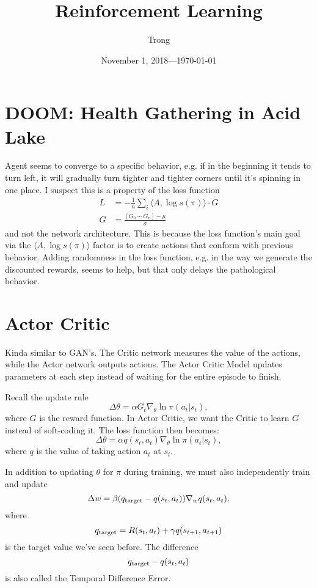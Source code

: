 \documentclass[20pt]{extarticle}
\title{Reinforcement Learning}
\author{Trong}
\date{November 1, 2018---\today}
\theoremstyle{plain}
\theoremstyle{definition}
\theoremstyle{remark}
\newcommand{\0}{\varnothing}
\renewcommand{\a}{\alpha}
\renewcommand{\b}{\beta}
\newcommand{\g}{\gamma}
\newcommand{\m}{\mu}
\newcommand{\s}{\sigma}
\renewcommand{\th}{\theta}
\newcommand{\D}{\Delta}
\newcommand{\<}{\langle}
\renewcommand{\>}{\rangle}
\begin{document}
\sloppy
\maketitle
\thispagestyle{empty}
\pagestyle{empty}
\tableofcontents

\section{DOOM: Health Gathering in Acid Lake}

Agent seems to converge to a specific behavior, e.g. if in the beginning it tends to turn left, it will gradually turn tighter and tighter corners until it's spinning in one place. I suspect this is a property of the loss function
\begin{align*}
  L &= - \frac{1}{n} \sum_{i} \< A, \log s(\pi) \> \cdot G \\
  G &= \frac{[G_0 \ \cdots \ G_n] - \m}{\s}
\end{align*}
and not the network architecture. This is because the loss function's main goal via the \( \< A, \log s(\pi) \> \) factor is to create actions that conform with previous behavior. Adding randomness in the loss function, e.g. in the way we generate the discounted rewards, seems to help, but that only delays the pathological behavior.

\break
\section{Actor Critic}

Kinda similar to GAN's. The Critic network measures the value of the actions, while the Actor network outputs actions. The Actor Critic Model updates parameters at each step instead of waiting for the entire episode to finish.

Recall the update rule
\[
\D \th = \a G_t \nabla_{\th} \ln \pi(a_t|s_t),
\]
where $ G $ is the reward function. In Actor Critic, we want the Critic to learn $ G $ instead of soft-coding it. The loss function then becomes: \[
\D \th = \a q(s_t, a_t) \nabla_{\th} \ln \pi(a_t|s_t),
\]
where $ q $ is the value of taking action $ a_t $ at $ s_t. $

In addition to updating $ \th $ for $ \pi $ during training, we must also independently train and update \[
\D w = \b (q_{\rm target} - q(s_t, a_t)) \nabla_{w} q(s_t, a_t),
\]
where \[
q_{\rm target} = R(s_t, a_t) + \g q(s_{t+1}, a_{t+1})
\]
is the target value we've seen before. The difference \[
q_{\rm target} - q(s_t, a_t)
\]
is also called the Temporal Difference Error.
\end{document}
